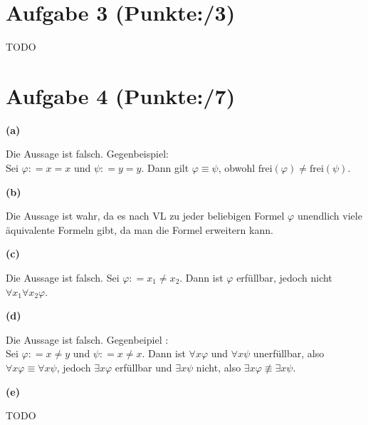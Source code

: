 \documentclass[11pt, a4paper]{article}
\newcommand{\pp}{3}
\newcommand{\ppp}{7}
\newcommand{\defgr}{\mathrel{\mathop:\!\!=}}
\begin{document}
\section*{Aufgabe 3 (Punkte:\qquad/\pp)}
\begin{adjustwidth}{20pt}{20pt}
TODO	
\end{adjustwidth}




\section*{Aufgabe 4 (Punkte:\qquad/\ppp)}
\textbf{(a)}
\begin{adjustwidth}{20pt}{20pt}
Die Aussage ist falsch. Gegenbeispiel:\\
Sei $\varphi \defgr x=x$ und 	$\psi \defgr y=y$. Dann gilt $\varphi \equiv \psi$, obwohl $\text{frei}(\varphi) \neq \text{frei}(\psi)$.
\end{adjustwidth}
\textbf{(b)}
\begin{adjustwidth}{20pt}{20pt}
Die Aussage ist wahr, da es nach VL zu jeder beliebigen Formel $\varphi$ unendlich viele äquivalente Formeln gibt, da man die Formel erweitern kann. 
\end{adjustwidth}
\textbf{(c)}
\begin{adjustwidth}{20pt}{20pt}
Die Aussage ist falsch. Sei $\varphi \defgr x_1 \neq x_2$. Dann ist $\varphi$ erfüllbar, jedoch nicht $\forall x_1 \forall x_2 \varphi$.
\end{adjustwidth}
\textbf{(d)}
\begin{adjustwidth}{20pt}{20pt}
Die Aussage ist falsch. Gegenbeipiel	:\\
Sei $\varphi \defgr x \neq y$ und $\psi \defgr x \neq x$. Dann ist $\forall x \varphi$ und $\forall x \psi$ unerfüllbar, also $\forall x \varphi \equiv \forall x \psi$, jedoch $\exists x \varphi$ erfüllbar und $\exists x \psi$ nicht, also $\exists x \varphi \not \equiv \exists x \psi$.
\end{adjustwidth}
\textbf{(e)}
\begin{adjustwidth}{20pt}{20pt}
TODO
\end{adjustwidth}
\end{document}

